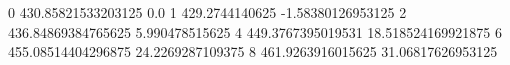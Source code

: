 0 430.85821533203125 0.0
1 429.2744140625 -1.58380126953125
2 436.84869384765625 5.990478515625
4 449.3767395019531 18.518524169921875
6 455.08514404296875 24.2269287109375
8 461.9263916015625 31.06817626953125
